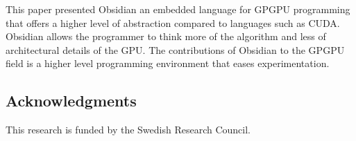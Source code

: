 
This paper presented Obsidian an embedded language for GPGPU programming that
offers a higher level of abstraction compared to languages such as CUDA. 
Obsidian allows the programmer to think more of the algorithm and less of 
architectural details of the GPU. The contributions of Obsidian to the GPGPU 
field is a higher level programming environment that eases experimentation. 

\subsection*{Acknowledgments}
\noindent
This research is funded by the Swedish Research Council.




%
%
		






%
